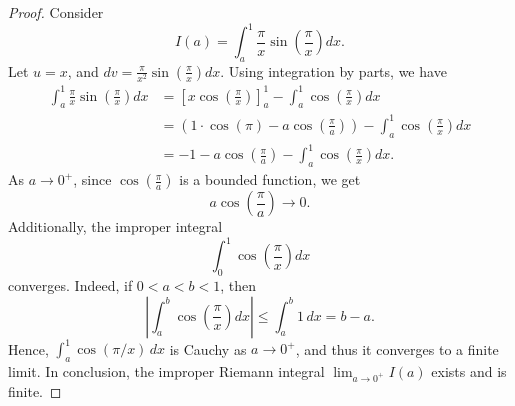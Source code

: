 \begin{proof}
    Consider
    \[
    I(a) = \int_a^1 \frac{\pi}{x} \sin\left(\frac{\pi}{x}\right) dx.
    \]
    Let $u = x$, and $dv = \frac{\pi}{x^2}\sin(\frac{\pi}{x})dx$. Using integration by parts, we have
    \[
    \begin{aligned}
    \int_a^1 \frac{\pi}{x} \sin\left(\frac{\pi}{x}\right) dx
    &=
    \left[ x \cos\left(\frac{\pi}{x}\right) \right]_a^1
    -
    \int_a^1 \cos\left(\frac{\pi}{x}\right) dx \\[6pt]
    &=
    \left(1 \cdot \cos(\pi) - a \cos\left(\frac{\pi}{a}\right)\right)
    -
    \int_a^1 \cos\left(\frac{\pi}{x}\right) dx \\[6pt]
    &=
    -1 - a \cos\left(\frac{\pi}{a}\right)
    -
    \int_a^1 \cos\left(\frac{\pi}{x}\right) dx .
    \end{aligned}
    \]
    As $a \to 0^+$, since $\cos\left(\frac{\pi}{a}\right)$ is a bounded function, we get
    \[
    a \cos\left(\frac{\pi}{a}\right) \to 0.
    \]
    Additionally, the improper integral
    \[
    \int_0^1 \cos\left(\frac{\pi}{x}\right)dx
    \]
    converges. Indeed, if \(0<a<b<1\), then
    \[
    \left|\int_a^b \cos\left(\frac{\pi}{x}\right)dx\right|
    \leq \int_a^b 1\,dx
    = b-a.
    \]
    Hence, \(\int_a^1 \cos(\pi/x)\,dx\) is Cauchy as \(a\to 0^+\), and thus it converges to a finite limit. In conclusion, the improper Riemann integral $\lim_{a \to 0^+} I(a)$ exists and is finite.


\end{proof}
